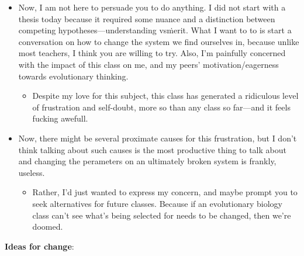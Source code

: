 \documentclass[12pt,a4paper]{article}
\begin{document}
\begin{itemize}
\begin{itemize}
\begin{itemize}
                    \end{itemize}
            \end{itemize}
        \item Now, I am not here to persuade you to do anything. I did not start with a thesis today because it required some nuance and a distinction between competing hypotheses---understanding vs\. merit. What I want to to is start a conversation on how to change the system we find ourselves in, because unlike most teachers, I think you are willing to try. Also, I'm painfully concerned with the impact of this class on me, and my peers' motivation/eagerness towards evolutionary thinking. 
            \begin{itemize}
                \item Despite my love for this subject, this class has generated a ridiculous level of frustration and self-doubt, more so than any class so far---and it feels fucking awefull.
            \end{itemize}
        \item Now, there might be several proximate causes for this frustration, but I don't think talking about such causes is the most productive thing to talk about and changing the perameters on an ultimately broken system is frankly, useless.
            \begin{itemize}
                \item Rather, I'd just wanted to express my concern, and maybe prompt you to seek alternatives for future classes. Because if an evolutionary biology class can't see what's being selected for needs to be changed, then we're doomed.
            \end{itemize}
    \end{itemize}
\textbf{Ideas for change}:
\end{document}
